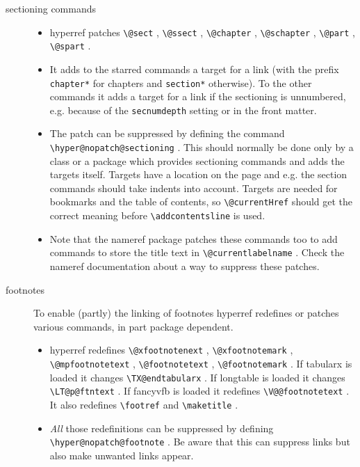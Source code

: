 \documentclass{article}
\newcommand*{\cs}[1]{%
  \texttt{\textbackslash #1}%
}
\newcommand*{\xpackage}[1]{\textsf{#1}}
\begin{document}
\begin{description}
\item[sectioning commands]
\begin{itemize}
\item \xpackage{hyperref} patches \cs{@sect}, \cs{@ssect}, \cs{@chapter}, \cs{@schapter},
\cs{@part}, \cs{@spart}.

\item It adds to the starred commands a target for a link (with the
prefix \texttt{chapter*} for chapters and \texttt{section*} otherwise).
To the other commands it adds a target for a link
if the sectioning is unnumbered, e.g. because of the \texttt{secnumdepth}
setting or in the front matter.

\item The patch can be suppressed by defining the command \cs{hyper@nopatch@sectioning}.
This should normally be done only by a class or a package
which provides sectioning commands and adds the targets itself.
Targets have a location on the page and e.g. the section commands should take indents into
account. Targets are needed for bookmarks and the table of contents,
so \cs{@currentHref} should get the correct meaning before
\cs{addcontentsline} is used.

\item Note that the \xpackage{nameref} package patches these commands too
to add commands to store the title text in \cs{@currentlabelname}.
Check the \xpackage{nameref} documentation about a way to suppress these patches.
\end{itemize}

\item[footnotes] To enable (partly) the linking of footnotes \xpackage{hyperref} redefines or patches various commands, in part package dependent.
\begin{itemize}
\item \xpackage{hyperref} redefines \cs{@xfootnotenext}, \cs{@xfootnotemark}, \cs{@mpfootnotetext},
    \cs{@footnotetext}, \cs{@footnotemark}.
    If \xpackage{tabularx} is loaded it changes \cs{TX@endtabularx}. If \xpackage{longtable} is loaded it changes \cs{LT@p@ftntext}.
    If \xpackage{fancyvfb} is loaded it redefines \cs{V@@footnotetext}. It also redefines \cs{footref} and \cs{maketitle}.

\item \emph{All} those redefinitions can be suppressed by defining \cs{hyper@nopatch@footnote}. Be aware that this can suppress links but also make unwanted links appear.
\end{itemize}


\end{description}
\end{document}
